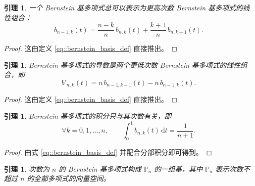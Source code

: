 \documentclass[a4paper]{ctexart}
\newtheorem{lemma}[theorem]{引理}
\numberwithin{theorem}{section}
\numberwithin{equation}{section}
\numberwithin{figure}{section}
\numberwithin{remark}{section}
\begin{document}
\begin{lemma}
一个 Bernstein 基多项式总可以表示为更高次数 Bernstein 基多项式的线性组合：
\begin{equation}
    \label{eq::bernstein_degree_elev}
b_{n-1,k}(t)=\frac{n-k}{n}\, b_{n,k}(t)+\frac{k+1}{n}\, b_{n,k+1}(t).
\end{equation}
\end{lemma}

\begin{proof}
这由定义 \eqref{eq::bernstein_basis_def} 直接推出。
\end{proof}

\begin{lemma}
Bernstein 基多项式的导数是两个更低次数 Bernstein 基多项式的线性组合，即
\begin{equation}
    \label{eq::bernstein_derivative}
b'_{n,k}(t)=n\, b_{n-1,k-1}(t)-n\, b_{n-1,k}(t).
\end{equation}
\end{lemma}

\begin{proof}
这由定义 \eqref{eq::bernstein_basis_def} 直接推出。
\end{proof}

\begin{lemma}
Bernstein 基多项式的积分只与其次数有关，即
\begin{equation}
    \label{eq::bernstein_integral}
\forall k=0,1,\ldots,n,\qquad \int_{0}^{1} b_{n,k}(t)\,\mathrm{d}t=\frac{1}{n+1}.
\end{equation}
\end{lemma}

\begin{proof}
由式 \eqref{eq::bernstein_basis_def} 并配合分部积分即可得到。
\end{proof}

\begin{lemma}
    \label{lem::bernstein_basis}
次数为 $n$ 的 Bernstein 基多项式构成 $\mathbb{P}_n$ 的一组基，其中 $\mathbb{P}_n$ 表示次数不超过 $n$ 的全部多项式的向量空间。
\end{lemma}
\end{document}
